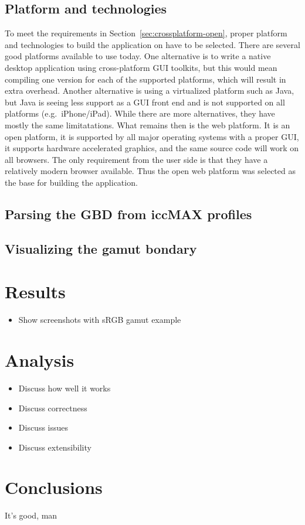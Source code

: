 \subsection{Platform and technologies}
To meet the requirements in Section~\ref{sec:crossplatform-open}, proper platform and technologies to build the application on have to be selected.
There are several good platforms available to use today.
One alternative is to write a native desktop application using cross-platform GUI toolkits, but this would mean compiling one version for each of the supported platforms, which will result in extra overhead.
Another alternative is using a virtualized platform such as Java, but Java is seeing less support as a GUI front end and is not supported on all platforms (e.g.\ iPhone/iPad).
While there are more alternatives, they have mostly the same limitatations.
What remains then is the web platform.
It is an open platform, it is supported by all major operating systems with a proper GUI, it supports hardware accelerated graphics, and the same source code will work on all browsers.
The only requirement from the user side is that they have a relatively modern browser available.
Thus the open web platform was selected as the base for building the application.



\subsection{Parsing the GBD from iccMAX profiles}
\subsection{Visualizing the gamut bondary}

\section{Results}
\begin{itemize}
	\item Show screenshots with sRGB gamut example
\end{itemize}

\section{Analysis}
\begin{itemize}
	\item Discuss how well it works
	\item Discuss correctness
	\item Discuss issues
	\item Discuss extensibility
\end{itemize}

\section{Conclusions}
It's good, man

